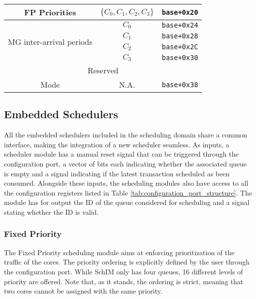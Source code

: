 \begin{table}[!ht]
\begin{tabular}{|c||c|c|}
                FP Priorities                                & $\{C_{0}, C_{1}, C_{2}, C_{3}\}$          & \verb|base+0x20|                    \\ \hline
                \multirow{4}{*}{MG inter-arrival periods} & $C_{0}$                                   & \verb|base+0x24|                    \\ \cline{2-3} 
                                                          & $C_{1}$                                   & \verb|base+0x28|                    \\ \cline{2-3} 
                                                          & $C_{2}$                                   & \verb|base+0x2C|                    \\ \cline{2-3} 
                                                          & $C_{3}$                                   & \verb|base+0x30|                    \\ \hline
                \multicolumn{3}{|c|}{Reserved}                                                                                              \\ \hline
                Mode                                      & N.A.                                      & \verb|base+0x38|                    \\ \hline
            \end{tabular}
        \end{table}

        
    \subsection{Embedded Schedulers}
        All the embedded schedulers included in the scheduling domain share a common interface, making the integration of a new scheduler seamless. As inputs, a scheduler module has a manual reset signal that can be triggered through the configuration port, a vector of bits each indicating whether the associated queue is empty and a signal indicating if the latest transaction scheduled as been consumed. Alongside these inputs, the scheduling modules also have access to all the configuration registers listed in Table \ref{tab:configuration_port_structure}. The module has for output the ID of the queue considered for scheduling and a signal stating whether the ID is valid.
        
        \subsubsection{Fixed Priority}
            The Fixed Priority scheduling module aims at enforcing prioritization of the traffic of the cores. The priority ordering is explicitly defined by the user through the configuration port. While SchIM only has four queues, 16 different levels of priority are offered. Note that, as it stands, the ordering is strict, meaning that two cores cannot be assigned with the same priority.
          
